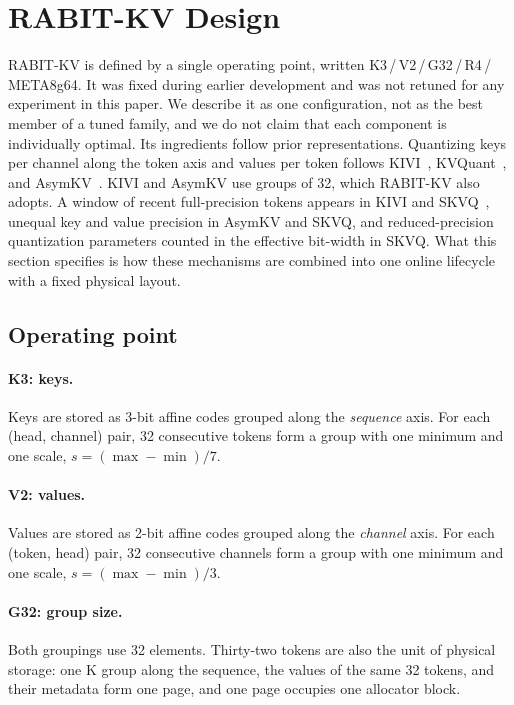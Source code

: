 \documentclass{article}
\begin{document}
\section{RABIT-KV Design}
\label{sec:design}

RABIT-KV is defined by a single operating point, written K3\,/\,V2\,/\,G32\,/\,R4\,/\,META8g64. It was
fixed during earlier development and was not retuned for any experiment in this paper. We describe it
as one configuration, not as the best member of a tuned family, and we do not claim that each component
is individually optimal. Its ingredients follow prior representations. Quantizing keys per channel
along the token axis and values per token follows KIVI~\citep{liu2024kivi},
KVQuant~\citep{hooper2024kvquant}, and AsymKV~\citep{tao2024asymkv}. KIVI and AsymKV use groups of 32,
which RABIT-KV also adopts.
A window of recent full-precision tokens appears in KIVI and SKVQ~\citep{duanmu2024skvq}, unequal key
and value precision in AsymKV and SKVQ, and reduced-precision quantization parameters counted in the
effective bit-width in SKVQ. What this section specifies is how these mechanisms are combined into one
online lifecycle with a fixed physical layout.

\subsection{Operating point}

\paragraph{K3: keys.}
Keys are stored as 3-bit affine codes grouped along the \emph{sequence} axis. For each (head, channel)
pair, 32 consecutive tokens form a group with one minimum and one scale, $s=(\max-\min)/7$.

\paragraph{V2: values.}
Values are stored as 2-bit affine codes grouped along the \emph{channel} axis. For each (token, head)
pair, 32 consecutive channels form a group with one minimum and one scale, $s=(\max-\min)/3$.

\paragraph{G32: group size.}
Both groupings use 32 elements. Thirty-two tokens are also the unit of physical storage: one K group
along the sequence, the values of the same 32 tokens, and their metadata form one page, and one page
occupies one allocator block.
\end{document}
